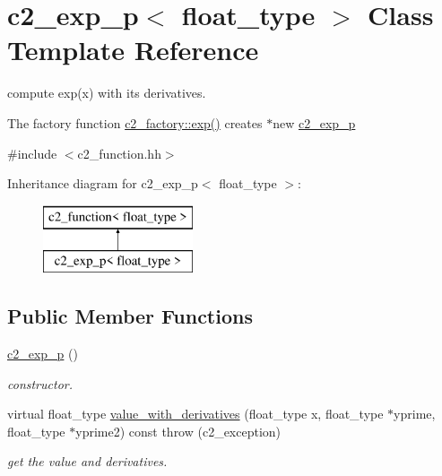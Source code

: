 \hypertarget{classc2__exp__p}{\section{c2\-\_\-exp\-\_\-p$<$ float\-\_\-type $>$ Class Template Reference}
\label{classc2__exp__p}
}


compute exp(x) with its derivatives.

The factory function \hyperlink{classc2__factory_ad6c29a455b386c1971e6614f6962f3da}{c2\-\_\-factory\-::exp()} creates $\ast$new \hyperlink{classc2__exp__p}{c2\-\_\-exp\-\_\-p}  




{\ttfamily \#include $<$c2\-\_\-function.\-hh$>$}

Inheritance diagram for c2\-\_\-exp\-\_\-p$<$ float\-\_\-type $>$\-:\begin{figure}[H]
\begin{center}
\leavevmode
\includegraphics[height=2.000000cm]{classc2__exp__p}
\end{center}
\end{figure}
\subsection*{Public Member Functions}
\begin{DoxyCompactItemize}
\item 
\hypertarget{classc2__exp__p_ae74cc4a62b953936481e8a8bfa265d25}{\hyperlink{classc2__exp__p_ae74cc4a62b953936481e8a8bfa265d25}{c2\-\_\-exp\-\_\-p} ()}\label{classc2__exp__p_ae74cc4a62b953936481e8a8bfa265d25}

\begin{DoxyCompactList}\small\item\em constructor. \end{DoxyCompactList}\item 
virtual float\-\_\-type \hyperlink{classc2__exp__p_a1c5cb28b65356b2f2290ae11d651f93e}{value\-\_\-with\-\_\-derivatives} (float\-\_\-type x, float\-\_\-type $\ast$yprime, float\-\_\-type $\ast$yprime2) const   throw (c2\-\_\-exception)
\begin{DoxyCompactList}\small\item\em get the value and derivatives. \end{DoxyCompactList}\end{DoxyCompactItemize}
